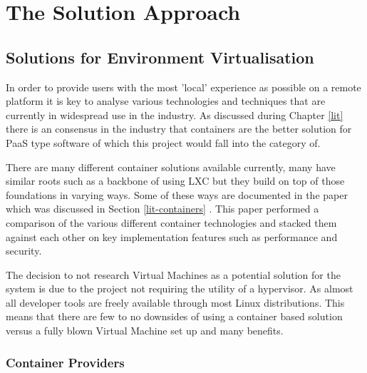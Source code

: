 \chapter{The Solution Approach}

\section{Solutions for Environment Virtualisation}
In order to provide users with the most 'local' experience as possible on a remote platform it is key to analyse various technologies and techniques that are currently in widespread use in the industry. As discussed during Chapter \ref{lit} there is an consensus in the industry that containers are the better solution for PaaS type software of which this project would fall into the category of.

There are many different container solutions available currently, many have similar roots such as a backbone of using LXC but they build on top of those foundations in varying ways. Some of these ways are documented in the paper which was discussed in Section \ref{lit-containers} \cite{contsvsvirt}. This paper performed a comparison of the various different container technologies and stacked them against each other on key implementation features such as performance and security. 

The decision to not research Virtual Machines as a potential solution for the system is due to the project not requiring the utility of a hypervisor. As almost all developer tools are freely available through most Linux distributions. This means that there are few to no downsides of using a container based solution versus a fully blown Virtual Machine set up and many benefits.

\subsection{Container Providers}

